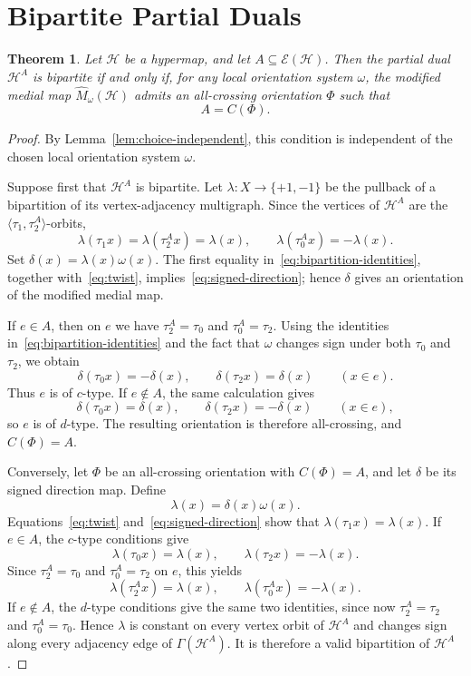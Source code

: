 \documentclass[10pt,a4paper]{article}
\newtheorem{theorem}{Theorem}[section]
\theoremstyle{definition}
\theoremstyle{remark}
\newcommand{\Hcal}{\mathcal{H}}
\newcommand{\Ecal}{\mathcal{E}}
\begin{document}
\section{Bipartite Partial Duals}

\begin{theorem}\label{thm:bipartite}
Let $\Hcal$ be a hypermap, and let $A\subseteq\Ecal(\Hcal)$. Then the partial dual $\Hcal^A$ is bipartite if and only if, for any local orientation system $\omega$, the modified medial map $\widehat M_\omega(\Hcal)$ admits an all-crossing orientation $\Phi$ such that
\[
A=C(\Phi).
\]
\end{theorem}

\begin{proof} By Lemma~\ref{lem:choice-independent}, this condition is independent of the chosen local orientation system $\omega$.

Suppose first that $\Hcal^A$ is bipartite. Let $\lambda:X\to\{+1,-1\}$ be the pullback of a bipartition of its vertex-adjacency multigraph. Since the vertices of $\Hcal^A$ are the $\langle\tau_1,\tau_2^A\rangle$-orbits,
\[
 \lambda(\tau_1x)=\lambda(\tau_2^Ax)=\lambda(x),
 \qquad
 \lambda(\tau_0^Ax)=-\lambda(x).\tag{B}\label{eq:bipartition-identities}
\]
Set $\delta(x)=\lambda(x)\omega(x)$. The first equality in~\eqref{eq:bipartition-identities}, together with~\eqref{eq:twist}, implies~\eqref{eq:signed-direction}; hence $\delta$ gives an orientation of the modified medial map.

If $e\in A$, then on $e$ we have $\tau_2^A=\tau_0$ and $\tau_0^A=\tau_2$. Using the identities in~\eqref{eq:bipartition-identities} and the fact that $\omega$ changes sign under both $\tau_0$ and $\tau_2$, we obtain
\[
 \delta(\tau_0x)=-\delta(x),\qquad
 \delta(\tau_2x)=\delta(x)\qquad(x\in e).
\]
Thus $e$ is of $c$-type. If $e\notin A$, the same calculation gives
\[
 \delta(\tau_0x)=\delta(x),\qquad
 \delta(\tau_2x)=-\delta(x)\qquad(x\in e),
\]
so $e$ is of $d$-type. The resulting orientation is therefore all-crossing, and $C(\Phi)=A$.

Conversely, let $\Phi$ be an all-crossing orientation with $C(\Phi)=A$, and let $\delta$ be its signed direction map. Define
\[
 \lambda(x)=\delta(x)\omega(x).
\]
Equations~\eqref{eq:twist} and~\eqref{eq:signed-direction} show that $\lambda(\tau_1x)=\lambda(x)$. If $e\in A$, the $c$-type conditions give
\[
 \lambda(\tau_0x)=\lambda(x),\qquad
 \lambda(\tau_2x)=-\lambda(x).
\]
Since $\tau_2^A=\tau_0$ and $\tau_0^A=\tau_2$ on $e$, this yields
\[
 \lambda(\tau_2^Ax)=\lambda(x),\qquad
 \lambda(\tau_0^Ax)=-\lambda(x).
\]
If $e\notin A$, the $d$-type conditions give the same two identities, since now $\tau_2^A=\tau_2$ and $\tau_0^A=\tau_0$. Hence $\lambda$ is constant on every vertex orbit of $\Hcal^A$ and changes sign along every adjacency edge of $\Gamma(\Hcal^A)$. It is therefore a valid bipartition of $\Hcal^A$.
\end{proof}
\end{document}
